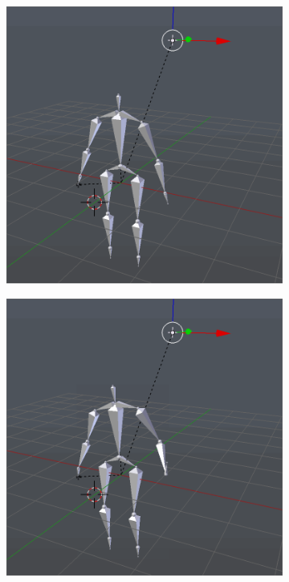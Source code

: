 \documentclass[10pt,twocolumn,letterpaper]{article}
\begin{document}
\begin{figure}[h]
    \begin{subfigure}{0.2\textwidth}
        \centering
        \includegraphics[width=.9\linewidth]{raise-linear-0.png}
    \end{subfigure}\begin{subfigure}{0.2\textwidth}
        \centering
        \includegraphics[width=.9\linewidth]{raise-linear-1.png}
    \end{subfigure}\begin{subfigure}{0.2\textwidth}

\end{subfigure}
\end{figure}
\end{document}
